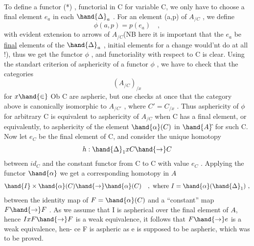 
To define a functor (*) , functorial in C for variable C, we only
have to choose a final element $e_a$ in each $\hand{\Delta}_a$ . For an element (a,p) of
$A_{/C}$ , we define
\[ \phi(a,p) = p(e_a) \quad , \]
with evident extension to arrows of $A_{/C}$\hand{\unsure{,}}(NB here it is important that the
$e_a$ be \uline{final} elements of the $\hand{\Delta}_a$ , initial elements for a change would'nt
do at all !), thus we get the functor $\phi$ , and functoriality with respect to
C is clear. Using the standart criterion of asphericity of a functor $\phi$ ,
we have to check that the categories
\[ (A_{/C})_{/x} \]
for $x \hand{\in}$ Ob C are aspheric, but one checks at once that the category above
is canonically isomorphic to $A_{/C'}$ , where $C' = C_{/x}$ . Thus asphericity
of $\phi$ for arbitrary C is equivalent to asphericity of $A_{/C}$ when C has a
final element, or equivalently, to asphericity of the element $\hand{\alpha}(C)$ in $\hand{A}\hat{}$
for such C. Now let $e_C$ be the final element of C, and consider the 
unique homotopy
\[ h : \hand{\Delta}_1 x C \hand{\to} C \]
between $id_C$ and the constant functor from C to C with value $e_C$ . Applying
the functor $\hand{\alpha}$ we get a corresponding homotopy in $A\hat{}$
\[ \hand{I} \times \hand{\alpha}(C) \hand{\to} \hand{\alpha}(C) \quad , \text{ where } I = \hand{\alpha}(\hand{\Delta}_1) \ , \]
between the identity map of $F = \hand{\alpha}(C)$ and a ``constant'' map $F \hand{\to} F$ . As we
assume that I is aspherical over the final element of $A\hat{}$, hence $IxF \hand{\to} F$
is a weak equivalence, it follows that $F \hand{\to} e$ is a weak equivalence, hen-%
ce F is aspheric as e is supposed to be aspheric, which was to be proved.


